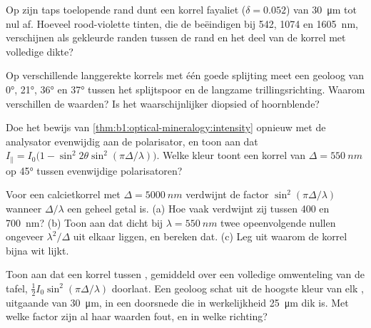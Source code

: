\begin{exercise}[$\star\star$]\label{exo:b1:optical-mineralogy:8}
Op zijn taps toelopende rand dunt een korrel fayaliet ($\delta = 0.052$) van \qty{30}{\micro m} tot nul af. Hoeveel rood-violette tinten, die de  beëindigen bij
542, 1074 en \qty{1605}{nm}, verschijnen als gekleurde randen tussen de rand en het deel van de korrel met volledige dikte?
\end{exercise}

\begin{exercise}[$\star\star$]\label{exo:b1:optical-mineralogy:9}
Op verschillende langgerekte korrels met één goede splijting meet een geoloog  van \ang{0}, \ang{21}, \ang{36} en \ang{37} tussen het splijtspoor en de
langzame trillingsrichting. Waarom verschillen de waarden? Is het  waarschijnlijker diopsied of hoornblende?
\end{exercise}

\begin{exercise}[$\star\star\star$]\label{exo:b1:optical-mineralogy:10}
Doe het bewijs van \cref{thm:b1:optical-mineralogy:intensity} opnieuw met de analysator evenwijdig aan de polarisator, en toon aan dat
$I_\parallel = I_0\bigl(1 - \sin^2 2\theta\sin^2(\pi\Delta/\lambda)\bigr)$. Welke kleur toont een korrel van $\Delta = \qty{550}{nm}$ op \ang{45} tussen evenwijdige polarisatoren?
\end{exercise}

\begin{exercise}[$\star\star\star$]\label{exo:b1:optical-mineralogy:11}
Voor een calcietkorrel met $\Delta = \qty{5000}{nm}$ verdwijnt de factor $\sin^2(\pi\Delta/\lambda)$ wanneer $\Delta/\lambda$ een geheel getal is. (a) Hoe vaak verdwijnt zij
tussen \num{400} en \qty{700}{nm}? (b) Toon aan dat dicht bij $\lambda = \qty{550}{nm}$ twee opeenvolgende nullen ongeveer $\lambda^2/\Delta$ uit elkaar liggen, en bereken dat.
(c) Leg uit waarom de korrel bijna wit lijkt.
\end{exercise}

\begin{exercise}[$\star\star\star$]\label{exo:b1:optical-mineralogy:12}
Toon aan dat een korrel tussen , gemiddeld over een volledige omwenteling van de tafel, $\frac12 I_0\sin^2(\pi\Delta/\lambda)$ doorlaat. Een geoloog
schat  uit de hoogste kleur van elk , uitgaande van \qty{30}{\micro m}, in een doorsnede die in werkelijkheid \qty{25}{\micro m} dik is. Met welke factor
zijn al haar waarden fout, en in welke richting?
\end{exercise}

